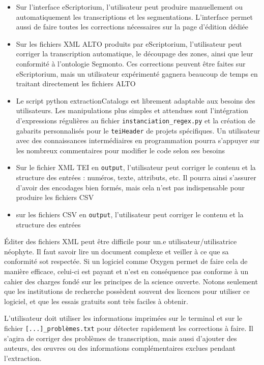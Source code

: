 \documentclass[a4paper,12pt,twoside]{book}
\begin{document}
\begin{itemize}
	\item Sur l'interface eScriptorium, l'utilisateur peut produire manuellement ou automatiquement les transcriptions et les segmentations. L'interface permet aussi de faire toutes les corrections nécessaires sur la page d'édition dédiée
	
	\item Sur les fichiers XML ALTO produits par eScriptorium, l'utilisateur peut corriger la transcription automatique, le découpage des zones, ainsi que leur conformité à l'ontologie Segmonto. Ces corrections peuvent être faites sur eScriptorium, mais un utilisateur expérimenté gagnera beaucoup de temps en traitant directement les fichiers ALTO
	
	\item Le script python extractionCatalogs est librement adaptable aux besoins des utilisateurs. Les manipulations plus simples et attendues sont l'intégration d'expressions régulières au fichier \texttt{instanciation\_regex.py} et la création de gabarits personnalisés pour le \texttt{teiHeader} de projets spécifiques. Un utilisateur avec des connaissances intermédiaires en programmation pourra s'appuyer sur les nombreux commentaires pour modifier le code selon ses besoins
	
	\item Sur le fichier XML TEI en \texttt{output}, l'utilisateur peut corriger le contenu et la structure des entrées : numéros, texte, attributs, etc. Il pourra ainsi s'assurer d'avoir des encodages bien formés, mais cela n'est pas indispensable pour produire les fichiers CSV
	
	\item sur les fichiers CSV en \texttt{output}, l'utilisateur peut corriger le contenu et la structure des entrées
\end{itemize}

Éditer des fichiers XML peut être difficile pour un.e utilisateur/utilisatrice néophyte. Il faut savoir lire un document complexe et veiller à ce que sa conformité sot respectée. Si un logiciel comme Oxygen permet de faire cela de manière efficace, celui-ci est payant et n'est en conséquence pas conforme à un cahier des charges fondé sur les principes de la science ouverte. Notons seulement que les institutions de recherche possèdent souvent des licences pour utiliser ce logiciel, et que les essais gratuits sont très faciles à obtenir. 

L'utilisateur doit utiliser les informations imprimées sur le terminal et sur le fichier \texttt{[...]\_problèmes.txt} pour détecter rapidement les corrections à faire. Il s'agira de corriger des problèmes de transcription, mais aussi d'ajouter des auteurs, des œuvres ou des informations complémentaires exclues pendant l'extraction.
\end{document}
